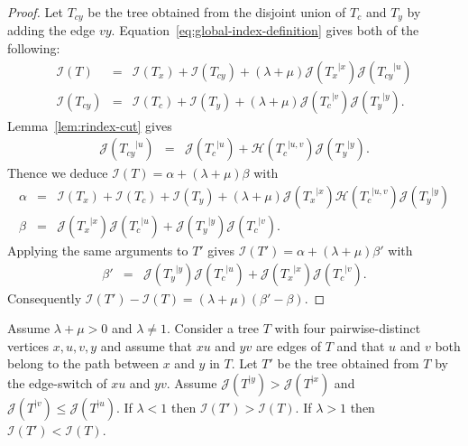 \documentclass[11 pt]{modarticle}
\newcommand{\rtree}[2]{{#1}^{\lvert #2}}
\newcommand{\indexsymbol}{\mathcal{I}}
\newcommand{\tindex}[1]{\indexsymbol(#1)}
\newcommand{\rindexsymbol}{\mathcal{J}}
\newcommand{\rindex}[2]{\rindexsymbol(\rtree{#2}{#1})}
\newcommand{\aindexsymbol}{\mathcal{H}}
\newcommand{\aindex}[3]{\aindexsymbol(\rtree{#3}{#1, #2})}
\begin{document}
\begin{proof}
Let $T_{cy}$ be the tree obtained from the disjoint union of $T_c$ and $T_y$ by adding the edge $vy$. Equation~\eqref{eq:global-index-definition} gives both of the following:
\begin{eqnarray*}
	\tindex{T} & = & \tindex{T_x} + \tindex{T_{cy}} + (\lambda + \mu) \rindex{x}{T_x} \rindex{u}{T_{cy}} \\
	\tindex{T_{cy}} & = & \tindex{T_c} + \tindex{T_y} + (\lambda + \mu) \rindex{v}{T_c} \rindex{y}{T_y}.
\end{eqnarray*}
Lemma~\ref{lem:rindex-cut} gives
\begin{eqnarray*}
	\rindex{u}{T_{cy}} & = & \rindex{u}{T_c} + \aindex{u}{v}{T_c} \rindex{y}{T_y}.
\end{eqnarray*}
Thence we deduce $\tindex{T} = \alpha + (\lambda + \mu) \beta$ with
\begin{eqnarray*}
	\alpha & = & \tindex{T_x} + \tindex{T_c} + \tindex{T_y} + (\lambda + \mu) \rindex{x}{T_x} \aindex{u}{v}{T_c} \rindex{y}{T_y} \\
	\beta & = & \rindex{x}{T_x}\rindex{u}{T_c} + \rindex{y}{T_y}\rindex{v}{T_c}.
\end{eqnarray*}
Applying the same arguments to $T'$ gives $\tindex{T'} = \alpha + (\lambda + \mu)\beta'$ with
\begin{eqnarray*}
	\beta' & = & \rindex{y}{T_y}\rindex{u}{T_c} + \rindex{x}{T_x}\rindex{v}{T_c}.
\end{eqnarray*}
Consequently $\tindex{T'} - \tindex{T} = (\lambda + \mu)(\beta' - \beta)$.
\end{proof}

\begin{prop}\label{prop:compacity-exchange}
Assume $\lambda + \mu > 0$ and $\lambda \neq 1$. Consider a tree $T$ with four pairwise-distinct vertices $x,u,v,y$ and assume that $xu$ and $yv$ are edges of $T$ and that $u$ and $v$ both belong to the path between $x$ and $y$ in $T$. Let $T'$ be the tree obtained from $T$ by the edge-switch of $xu$ and $yv$. Assume $\rindex{y}{T} > \rindex{x}{T}$ and $\rindex{v}{T} \leq \rindex{u}{T}$. If $\lambda < 1$ then $\tindex{T'} > \tindex{T}$. If $\lambda > 1$ then $\tindex{T'} < \tindex{T}$.
\end{prop}
\end{document}
